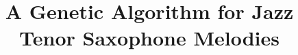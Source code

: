 \documentclass{article}
\title{A Genetic Algorithm for Jazz Tenor Saxophone Melodies}
\begin{document}
\maketitle








\nocite{*}

\end{document}
